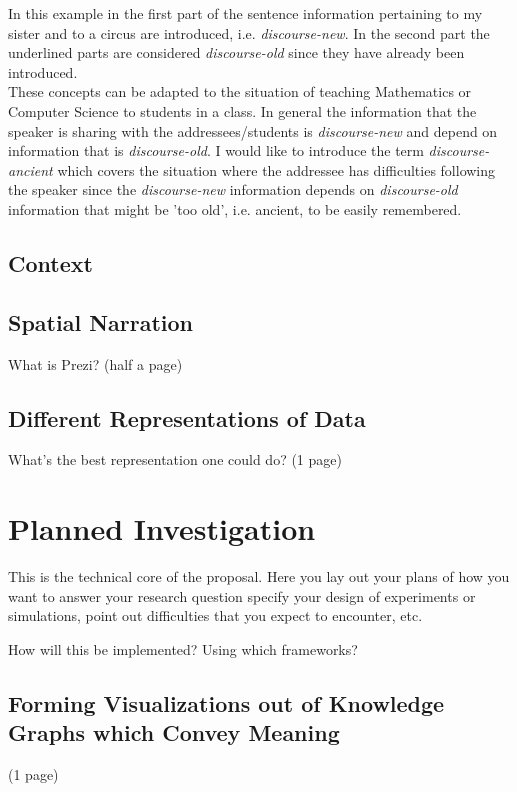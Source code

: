 \documentclass[twoside]{article}
\begin{document}
In this example in the first part of the sentence information pertaining to my sister and to a circus are introduced, i.e. \textit{discourse-new}. In the second part the underlined parts are considered \textit{discourse-old} since they have already been introduced.\cite{Cambridge}\\

These concepts can be adapted to the situation of teaching Mathematics or Computer Science to students in a class. In general the information that the speaker is sharing with the addressees/students is \textit{discourse-new} and depend on  information that is \textit{discourse-old}. I would like to introduce the term \textit{discourse-ancient} which covers the situation where the addressee has difficulties following the speaker since the \textit{discourse-new} information depends on \textit{discourse-old} information that might be 'too old', i.e. ancient, to be easily remembered.\\

\subsection{Context}


\subsection{Spatial Narration}
What is Prezi?
(half a page)
\vspace*{8cm}
\subsection{Different Representations of Data}
What's the best representation one could do?
(1 page)


\section{Planned Investigation}

  This is the technical core of the proposal. Here you lay out your
  plans of how you want to answer your research question specify your
  design of experiments or simulations, point out difficulties that
  you expect to encounter, etc.

How will this be implemented?
Using which frameworks?
  

\subsection{Forming Visualizations out of Knowledge Graphs which Convey Meaning}
(1 page)
\newpage
\end{document}
